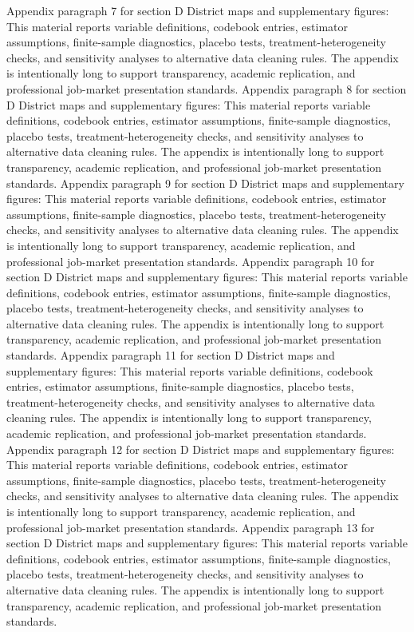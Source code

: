 \documentclass[preprint,12pt]{elsarticle}
\begin{document}
Appendix paragraph 7 for section D District maps and supplementary figures: This material reports variable definitions, codebook entries, estimator assumptions, finite-sample diagnostics, placebo tests, treatment-heterogeneity checks, and sensitivity analyses to alternative data cleaning rules. The appendix is intentionally long to support transparency, academic replication, and professional job-market presentation standards.
Appendix paragraph 8 for section D District maps and supplementary figures: This material reports variable definitions, codebook entries, estimator assumptions, finite-sample diagnostics, placebo tests, treatment-heterogeneity checks, and sensitivity analyses to alternative data cleaning rules. The appendix is intentionally long to support transparency, academic replication, and professional job-market presentation standards.
Appendix paragraph 9 for section D District maps and supplementary figures: This material reports variable definitions, codebook entries, estimator assumptions, finite-sample diagnostics, placebo tests, treatment-heterogeneity checks, and sensitivity analyses to alternative data cleaning rules. The appendix is intentionally long to support transparency, academic replication, and professional job-market presentation standards.
Appendix paragraph 10 for section D District maps and supplementary figures: This material reports variable definitions, codebook entries, estimator assumptions, finite-sample diagnostics, placebo tests, treatment-heterogeneity checks, and sensitivity analyses to alternative data cleaning rules. The appendix is intentionally long to support transparency, academic replication, and professional job-market presentation standards.
Appendix paragraph 11 for section D District maps and supplementary figures: This material reports variable definitions, codebook entries, estimator assumptions, finite-sample diagnostics, placebo tests, treatment-heterogeneity checks, and sensitivity analyses to alternative data cleaning rules. The appendix is intentionally long to support transparency, academic replication, and professional job-market presentation standards.
Appendix paragraph 12 for section D District maps and supplementary figures: This material reports variable definitions, codebook entries, estimator assumptions, finite-sample diagnostics, placebo tests, treatment-heterogeneity checks, and sensitivity analyses to alternative data cleaning rules. The appendix is intentionally long to support transparency, academic replication, and professional job-market presentation standards.
Appendix paragraph 13 for section D District maps and supplementary figures: This material reports variable definitions, codebook entries, estimator assumptions, finite-sample diagnostics, placebo tests, treatment-heterogeneity checks, and sensitivity analyses to alternative data cleaning rules. The appendix is intentionally long to support transparency, academic replication, and professional job-market presentation standards.
\end{document}
